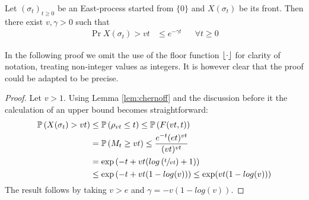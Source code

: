 \begin{theorem}\label{thm:speed_upper_bound}
Let $(\sigma_t)_{t \geq 0}$ be an East-process started from $\{0\}$ and $X(\sigma_t)$ be its front. Then there exist $v, \gamma > 0$ such that 
\begin{align}
\Pr{X(\sigma_t) > vt} &\leq e^{- \gamma t} &&\forall t \geq 0
\end{align}
\end{theorem}

\begin{remark}
In the following proof we omit the use of the floor function $\lfloor\cdot\rfloor$ for clarity of notation, treating non-integer values as integers. It is however clear that the proof could be adapted to be precise. 
\end{remark}

\begin{proof}
Let $v > 1$. Using Lemma \ref{lem:chernoff} and the discussion before it the calculation of an upper bound becomes straightforward:
\begin{align*}
\mathbb{P} \left( X(\sigma_t) > vt \right) &\leq \mathbb{P} \left( \rho_{vt} \leq t \right) \leq \mathbb{P} \left( F(vt, t) \right) \\
                     &= \mathbb{P} \left( M_t \geq vt \right) \leq \frac{e^{-t}(e t)^{vt}}{(vt)^{vt}} \\
                     &= \exp\left( -t + vt(log\left(\sfrac{t}{vt}\right) + 1)\right) \\
                     &\leq \exp\left( -t + vt (1 - log(v))\right) \leq \exp(vt (1 - log(v)))
\end{align*}
The result follows by taking $v > e$ and $\gamma = - v (1 - log(v))$. 
\end{proof}




